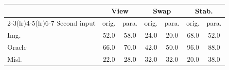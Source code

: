 \begin{tabular}{lcccccc}
\toprule
 & \multicolumn{2}{c}{View} & \multicolumn{2}{c}{Swap} & \multicolumn{2}{c}{Stab.} \\
\cmidrule(lr){2-3}\cmidrule(lr){4-5}\cmidrule(lr){6-7}
Second input & orig. & para. & orig. & para. & orig. & para. \\
\midrule
Img. & 52.0 & 58.0 & 24.0 & 20.0 & 68.0 & 52.0 \\
Oracle & 66.0 & 70.0 & 42.0 & 50.0 & 96.0 & 88.0 \\
Misl. & 22.0 & 28.0 & 32.0 & 32.0 & 20.0 & 38.0 \\
\bottomrule
\end{tabular}
